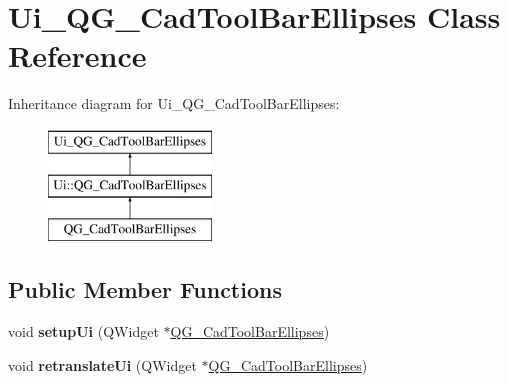 \hypertarget{classUi__QG__CadToolBarEllipses}{\section{Ui\-\_\-\-Q\-G\-\_\-\-Cad\-Tool\-Bar\-Ellipses Class Reference}
\label{classUi__QG__CadToolBarEllipses}
}
Inheritance diagram for Ui\-\_\-\-Q\-G\-\_\-\-Cad\-Tool\-Bar\-Ellipses\-:\begin{figure}[H]
\begin{center}
\leavevmode
\includegraphics[height=3.000000cm]{classUi__QG__CadToolBarEllipses}
\end{center}
\end{figure}
\subsection*{Public Member Functions}
\begin{DoxyCompactItemize}
\item 
\hypertarget{classUi__QG__CadToolBarEllipses_ae0fb9948ff29513f5fa6ec0bff18beb3}{void {\bfseries setup\-Ui} (Q\-Widget $\ast$\hyperlink{classQG__CadToolBarEllipses}{Q\-G\-\_\-\-Cad\-Tool\-Bar\-Ellipses})}\label{classUi__QG__CadToolBarEllipses_ae0fb9948ff29513f5fa6ec0bff18beb3}

\item 
\hypertarget{classUi__QG__CadToolBarEllipses_aeb5c61e4c6a8a6a31298754478cbc4de}{void {\bfseries retranslate\-Ui} (Q\-Widget $\ast$\hyperlink{classQG__CadToolBarEllipses}{Q\-G\-\_\-\-Cad\-Tool\-Bar\-Ellipses})}\label{classUi__QG__CadToolBarEllipses_aeb5c61e4c6a8a6a31298754478cbc4de}

\end{DoxyCompactItemize}
